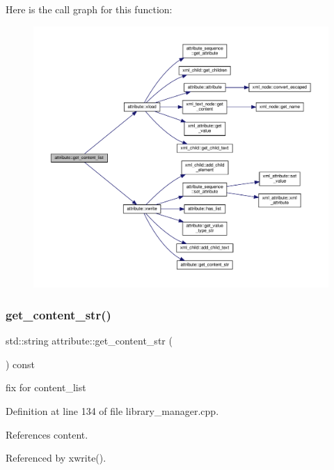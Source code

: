 Here is the call graph for this function\+:
\nopagebreak
\begin{figure}[H]
\begin{center}
\leavevmode
\includegraphics[width=350pt]{d9/d18/structattribute_a48846ecae25fc8c990c01ba21de1ba7b_cgraph}
\end{center}
\end{figure}
\mbox{\label{structattribute_abe1be3f2ea1fea96b490e4e0d12da955}} 
\subsubsection{\texorpdfstring{get\+\_\+content\+\_\+str()}{get\_content\_str()}}
{\footnotesize\ttfamily std\+::string attribute\+::get\+\_\+content\+\_\+str (\begin{DoxyParamCaption}{ }\end{DoxyParamCaption}) const}

fix for content\+\_\+list 

Definition at line 134 of file library\+\_\+manager.\+cpp.



References content.



Referenced by xwrite().

